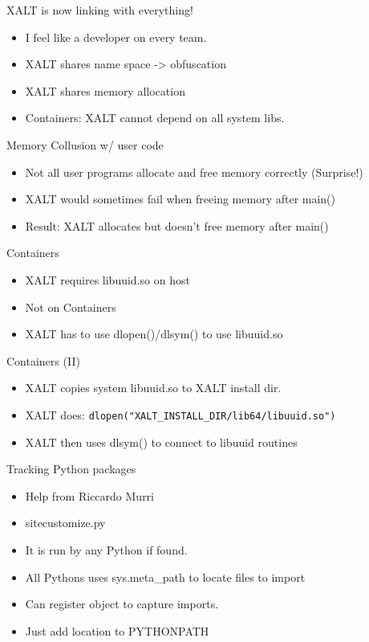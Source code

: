 \documentclass{beamer}
\begin{document}
\begin{frame}{XALT is now linking with everything!}
  \begin{itemize}
    \item I feel like a developer on every team.
    \item XALT shares name space -> obfuscation
    \item XALT shares memory allocation
    \item Containers: XALT cannot depend on all system libs.
  \end{itemize}
\end{frame}

\begin{frame}{Memory Collusion w/ user code }
  \begin{itemize}
    \item Not all user programs allocate and free memory correctly (Surprise!)
    \item XALT would sometimes fail when freeing memory after main()
    \item Result: XALT allocates but doesn't free memory after main()
  \end{itemize}
\end{frame}

\begin{frame}{Containers}
  \begin{itemize}
    \item XALT requires libuuid.so on host
    \item Not on Containers
    \item XALT has to use dlopen()/dlsym() to use libuuid.so
  \end{itemize}
\end{frame}

\begin{frame}{Containers (II)}
  \begin{itemize}
    \item XALT copies system libuuid.so to XALT install dir.
    \item XALT does: \texttt{dlopen("XALT\_INSTALL\_DIR/lib64/libuuid.so")}
    \item XALT then uses dlsym() to connect to libuuid routines
  \end{itemize}
\end{frame}

\begin{frame}{Tracking Python packages}
  \begin{itemize}
    \item Help from Riccardo Murri
    \item sitecustomize.py
    \item It is run by any Python if found.
    \item All Pythons uses sys.meta\_path to locate files to import
    \item Can register object to capture imports.
    \item Just add location to PYTHONPATH
  \end{itemize}
\end{frame}
\end{document}
